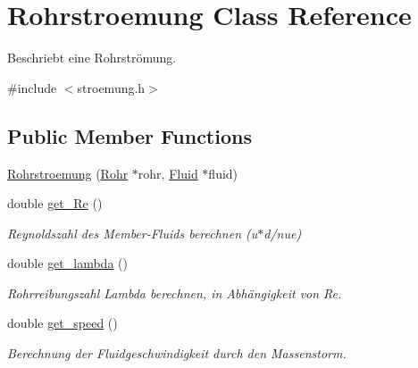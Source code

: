 \hypertarget{class_rohrstroemung}{}\section{Rohrstroemung Class Reference}
\label{class_rohrstroemung}


Beschriebt eine Rohrströmung.  




{\ttfamily \#include $<$stroemung.\+h$>$}

\subsection*{Public Member Functions}
\begin{DoxyCompactItemize}
\item 
\hyperlink{class_rohrstroemung_aa8ee146566f18b2a4ca4cbfc1946c2b8}{Rohrstroemung} (\hyperlink{class_rohr}{Rohr} $\ast$rohr, \hyperlink{class_fluid}{Fluid} $\ast$fluid)
\item 
\mbox{\label{class_rohrstroemung_aa491056aa77acac305aca0fde9c3e8bc}} 
double \hyperlink{class_rohrstroemung_aa491056aa77acac305aca0fde9c3e8bc}{get\+\_\+\+Re} ()
\begin{DoxyCompactList}\small\item\em Reynoldszahl des Member-\/\+Fluids berechnen (u$\ast$d/nue) \end{DoxyCompactList}\item 
double \hyperlink{class_rohrstroemung_a7ea25aca94625ef68bf856d957419d26}{get\+\_\+lambda} ()
\begin{DoxyCompactList}\small\item\em Rohrreibungszahl Lambda berechnen, in Abhängigkeit von Re. \end{DoxyCompactList}\item 
\mbox{\label{class_rohrstroemung_aa4f7d016ed9f920b8e8f0c9bdbae5213}} 
double \hyperlink{class_rohrstroemung_aa4f7d016ed9f920b8e8f0c9bdbae5213}{get\+\_\+speed} ()
\begin{DoxyCompactList}\small\item\em Berechnung der Fluidgeschwindigkeit durch den Massenstorm. \end{DoxyCompactList}\item 
\mbox{\label{class_rohrstroemung_ac4d2f31e451f1a3c97627d3a87df419d}} 

\end{DoxyCompactItemize}
